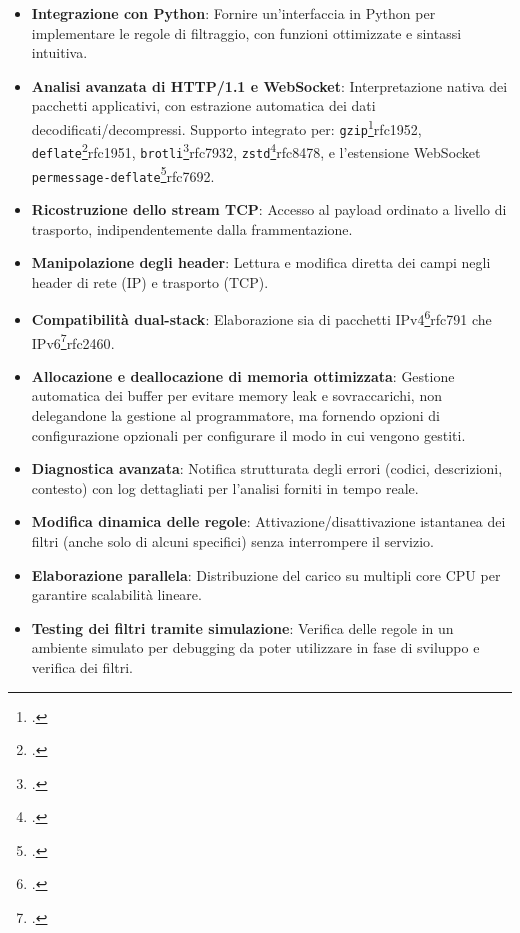 \begin{itemize}
    \setlength{\itemsep}{4pt}
    \setlength{\parskip}{4pt}
    
    \item \textbf{Integrazione con Python}: Fornire un'interfaccia in Python per implementare le regole di filtraggio, con funzioni ottimizzate e sintassi intuitiva.
    
    \item \textbf{Analisi avanzata di HTTP/1.1 e WebSocket}: Interpretazione nativa dei pacchetti applicativi, con estrazione automatica dei dati decodificati/decompressi. Supporto integrato per:
    \texttt{gzip}\footcite{RFC1952, GZIP file format specification version 4.3}{rfc1952},
    \texttt{deflate}\footcite{RFC1951, DEFLATE Compressed Data Format Specification version 1.3}{rfc1951},
    \texttt{brotli}\footcite{RFC7932, Brotli Compressed Data Format}{rfc7932},
    \texttt{zstd}\footcite{RFC8478, Zstandard Compression and the application/zstd Media Type}{rfc8478}, 
    e l'estensione WebSocket \texttt{permessage-deflate}\footcite{RFC7692, Compression Extensions for WebSocket}{rfc7692}.
    
    \item \textbf{Ricostruzione dello stream TCP}: Accesso al payload ordinato a livello di trasporto, indipendentemente dalla frammentazione.
    
    \item \textbf{Manipolazione degli header}: Lettura e modifica diretta dei campi negli header di rete (IP) e trasporto (TCP).
    
    \item \textbf{Compatibilità dual-stack}: Elaborazione sia di pacchetti IPv4\footcite{RFC791, Internet Protocol}{rfc791} che IPv6\footcite{RFC2460, Internet Protocol, Version 6 (IPv6) Specification}{rfc2460}.
    
    \item \textbf{Allocazione e deallocazione di memoria ottimizzata}: Gestione automatica dei buffer per evitare memory leak e sovraccarichi, non delegandone la gestione al programmatore, ma fornendo opzioni di configurazione opzionali per configurare il modo in cui vengono gestiti.
    
    \item \textbf{Diagnostica avanzata}: Notifica strutturata degli errori (codici, descrizioni, contesto) con log dettagliati per l'analisi forniti in tempo reale.
    
    \item \textbf{Modifica dinamica delle regole}: Attivazione/disattivazione istantanea dei filtri (anche solo di alcuni specifici) senza interrompere il servizio.
    
    \item \textbf{Elaborazione parallela}: Distribuzione del carico su multipli core CPU per garantire scalabilità lineare.
    
    \item \textbf{Testing dei filtri tramite simulazione}: Verifica delle regole in un ambiente simulato per debugging da poter utilizzare in fase di sviluppo e verifica dei filtri.
\end{itemize}

